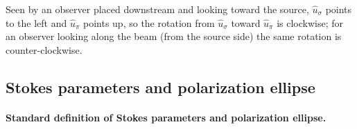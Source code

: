 \documentclass{iucr}
\begin{document}
Seen by an observer placed downstream and looking toward the source, $\hat{u}_\sigma$ points to the left and $\hat{u}_\pi$ points up, so the rotation from $\hat{u}_\sigma$ toward $\hat{u}_\pi$ is clockwise; for an observer looking along the beam (from the source side) the same rotation is counter-clockwise.

\subsection{Stokes parameters and polarization ellipse}\label{sec:polarization_stokes}
\paragraph{Standard definition of Stokes parameters and polarization ellipse.}
\end{document}
